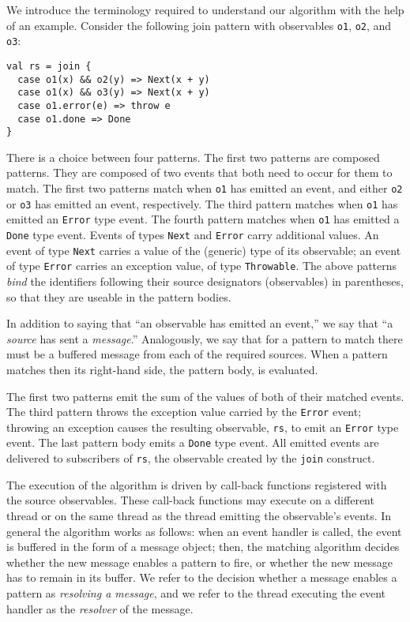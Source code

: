 \documentclass[runningheads]{llncs}
\begin{document}
\begin{sloppypar}

We introduce the terminology required to understand our algorithm with the
help of an example. Consider the following join pattern with observables
\verb|o1|, \verb|o2|, and \verb|o3|:

\begin{lstlisting}
val rs = join {
  case o1(x) && o2(y) => Next(x + y)
  case o1(x) && o3(y) => Next(x + y)
  case o1.error(e) => throw e
  case o1.done => Done
}
\end{lstlisting}

\noindent
There is a choice between four patterns. The first two patterns are composed
patterns. They are composed of two events that both need to occur for them to
match. The first two patterns match when \texttt{o1} has emitted an event, and
either \texttt{o2} or \texttt{o3} has emitted an event, respectively. The
third pattern matches when \texttt{o1} has emitted an \texttt{Error} type
event. The fourth pattern matches when \texttt{o1} has emitted a \texttt{Done}
type event. Events of types \texttt{Next} and \texttt{Error} carry additional
values. An event of type \texttt{Next} carries a value of the (generic) type
of its observable; an event of type \texttt{Error} carries an exception value,
of type \texttt{Throwable}. The above patterns {\em bind} the identifiers
following their source designators (observables) in parentheses, so that they
are useable in the pattern bodies.

In addition to saying that ``an observable has emitted an event,'' we say that
``a \emph{source} has sent a \emph{message}.'' Analogously, we say that for a
pattern to match there must be a buffered message from each of the required
sources. When a pattern matches then its right-hand side, the pattern body, is
evaluated.

The first two patterns emit the sum of the values of both of their matched
events. The third pattern throws the exception value carried by the
\texttt{Error} event; throwing an exception causes the resulting observable,
\verb|rs|, to emit an \texttt{Error} type event. The last pattern body emits a
\texttt{Done} type event. All emitted events are delivered to subscribers of
\texttt{rs}, the observable created by the \verb|join| construct.

The execution of the algorithm is driven by call-back functions registered
with the source observables. These call-back functions may execute on a
different thread or on the same thread as the thread emitting the observable's
events. In general the algorithm works as follows: when an event handler is
called, the event is buffered in the form of a message object; then, the
matching algorithm decides whether the new message enables a pattern to fire,
or whether the new message has to remain in its buffer. We refer to the
decision whether a message enables a pattern as \emph{resolving a message},
and we refer to the thread executing the event handler as the \emph{resolver}
of the message.


\end{sloppypar}
\end{document}
